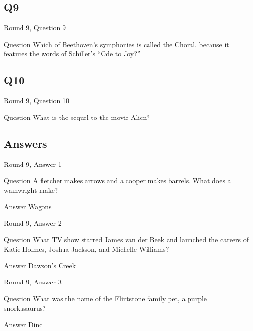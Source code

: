 \documentclass[11pt]{beamer}
\begin{document}
\subsection*{Q9}
\begin{frame}[t]{Round 9, Question 9}
\vspace{2em}
\begin{block}{Question}
Which of Beethoven's symphonies is called the Choral, because it features the words of Schiller's ``Ode to Joy?''
\end{block}
\end{frame}
    

\subsection*{Q10}
\begin{frame}[t]{Round 9, Question 10}
\vspace{2em}
\begin{block}{Question}
What is the sequel to the movie Alien\@?
\end{block}
\end{frame}
    
\subsection{Answers}

\begin{frame}[t]{Round 9, Answer 1}
\vspace{2em}
\begin{block}{Question}
A fletcher makes arrows and a cooper makes barrels. What does a wainwright make\@?
\end{block}
\pause{}
\begin{block}{Answer}
Wagons
\end{block}
\end{frame}
    

\begin{frame}[t]{Round 9, Answer 2}
\vspace{2em}
\begin{block}{Question}
What TV show starred James van der Beek and launched the careers of Katie Holmes, Joshua Jackson, and Michelle Williams\@?
\end{block}
\pause{}
\begin{block}{Answer}
Dawson's Creek
\end{block}
\end{frame}
    

\begin{frame}[t]{Round 9, Answer 3}
\vspace{2em}
\begin{block}{Question}
What was the name of the Flintstone family pet, a purple snorkasaurus\@?
\end{block}
\pause{}
\begin{block}{Answer}
Dino
\end{block}
\end{frame}
    
\end{document}
